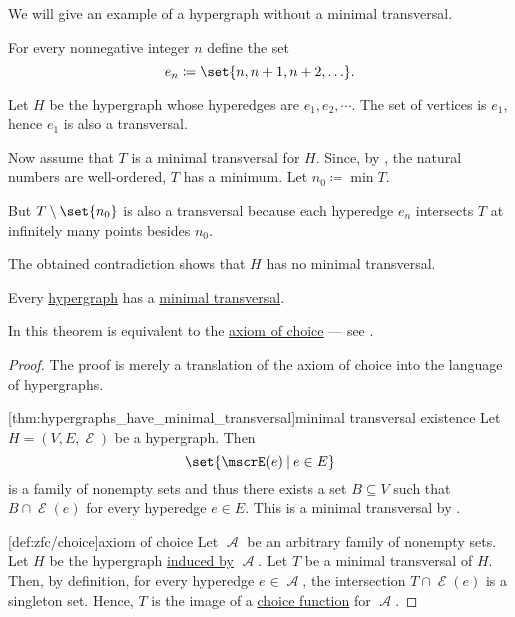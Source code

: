 \begin{example}\label{ex:hypergraph_with_no_minimal_transversal}
  We will give an example of a hypergraph without a minimal transversal.

  For every nonnegative integer \( n \) define the set
  \begin{equation*}
    e_n \coloneqq \set{ n, n + 1, n + 2, \ldots }.
  \end{equation*}

  Let \( H \) be the hypergraph whose hyperedges are \( e_1, e_2, \cdots \). The set of vertices is \( e_1 \), hence \( e_1 \) is also a transversal.

  Now assume that \( T \) is a minimal transversal for \( H \). Since, by , the natural numbers are well-ordered, \( T \) has a minimum. Let \( n_0 \coloneqq \min T \).

  But \( T \setminus \set{ n_0 } \) is also a transversal because each hyperedge \( e_n \) intersects \( T \) at infinitely many points besides \( n_0 \).

  The obtained contradiction shows that \( H \) has no minimal transversal.
\end{example}

\begin{theorem}\label{thm:hypergraphs_have_minimal_transversal}
  Every \hyperref[def:hypergraph]{hypergraph} has a \hyperref[def:hypergraph_minimal_transversal]{minimal transversal}.

  In \hyperref[def:zfc]{} this theorem is equivalent to the \hyperref[def:zfc/choice]{axiom of choice} --- see .
\end{theorem}
\begin{proof}
  The proof is merely a translation of the axiom of choice into the language of hypergraphs.

  [thm:hypergraphs_have_minimal_transversal]{minimal transversal existence} Let \( H = (V, E, \mscrE) \) be a hypergraph. Then
  \begin{equation*}
    \set{ \mscrE(e) \given e \in E }
  \end{equation*}
  is a family of nonempty sets and thus there exists a set \( B \subseteq V \) such that \( B \cap \mscrE(e) \) for every hyperedge \( e \in E \). This is a minimal transversal by .

  [def:zfc/choice]{axiom of choice} Let \( \mscrA \) be an arbitrary family of nonempty sets. Let \( H \) be the hypergraph \hyperref[thm:family_of_sets_induces_hypergraph]{induced by} \( \mscrA \). Let \( T \) be a minimal transversal of \( H \). Then, by definition, for every hyperedge \( e \in \mscrA \), the intersection \( T \cap \mscrE(e) \) is a singleton set. Hence, \( T \) is the image of a \hyperref[def:choice_function]{choice function} for \( \mscrA \).
\end{proof}
